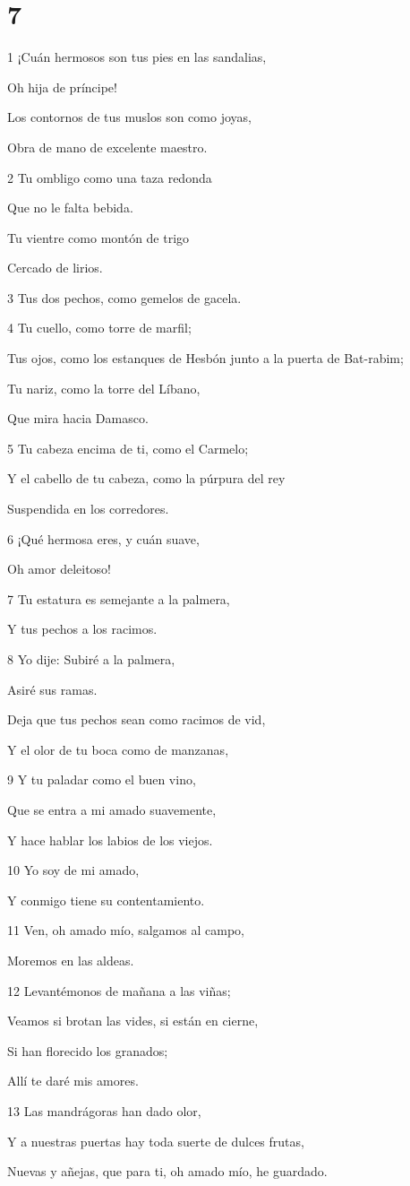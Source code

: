 \chapter{7}

\par 1 ¡Cuán hermosos son tus pies en las sandalias,
\par Oh hija de príncipe!
\par Los contornos de tus muslos son como joyas,
\par Obra de mano de excelente maestro.
\par 2 Tu ombligo como una taza redonda
\par Que no le falta bebida.
\par Tu vientre como montón de trigo
\par Cercado de lirios.
\par 3 Tus dos pechos, como gemelos de gacela.
\par 4 Tu cuello, como torre de marfil;
\par Tus ojos, como los estanques de Hesbón junto a la puerta de Bat-rabim;
\par Tu nariz, como la torre del Líbano,
\par Que mira hacia Damasco.
\par 5 Tu cabeza encima de ti, como el Carmelo;
\par Y el cabello de tu cabeza, como la púrpura del rey
\par Suspendida en los corredores. 
\par 6 ¡Qué hermosa eres, y cuán suave,
\par Oh amor deleitoso!
\par 7 Tu estatura es semejante a la palmera,
\par Y tus pechos a los racimos.
\par 8 Yo dije: Subiré a la palmera,
\par Asiré sus ramas.
\par Deja que tus pechos sean como racimos de vid,
\par Y el olor de tu boca como de manzanas,
\par 9 Y tu paladar como el buen vino,
\par Que se entra a mi amado suavemente,
\par Y hace hablar los labios de los viejos.
\par 10 Yo soy de mi amado,
\par Y conmigo tiene su contentamiento.
\par 11 Ven, oh amado mío, salgamos al campo,
\par Moremos en las aldeas.
\par 12 Levantémonos de mañana a las viñas;
\par Veamos si brotan las vides, si están en cierne,
\par Si han florecido los granados;
\par Allí te daré mis amores.
\par 13 Las mandrágoras han dado olor,
\par Y a nuestras puertas hay toda suerte de dulces frutas,
\par Nuevas y añejas, que para ti, oh amado mío, he guardado. 

